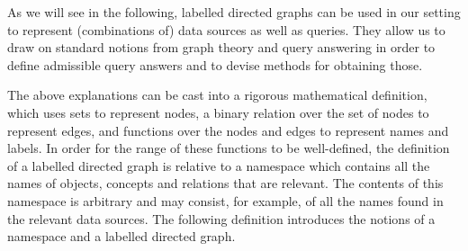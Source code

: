 As we will see in the following, labelled directed graphs can be used in our setting
to represent (combinations of) data sources as well as queries.
They allow us to draw on standard notions from graph theory and query answering
in order to define admissible query answers and to devise methods for obtaining those.


The above explanations can be cast into a rigorous mathematical definition,
which uses sets to represent nodes, a binary relation over the set of nodes
to represent edges, and functions over the nodes and edges to represent
names and labels. In order for the range of these functions to be well-defined,
the definition of a labelled directed graph is relative to a namespace which
contains all the names of objects, concepts and relations that are relevant.
The contents of this namespace is arbitrary and may consist,
for example, of all the names found in the relevant data sources.
The following definition introduces the notions of a namespace and a
labelled directed graph.
%
%
